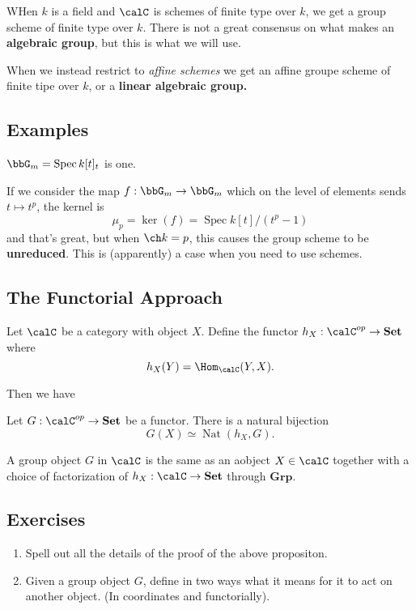 \documentclass[12pt]{article}
\DeclareMathOperator{\1}{\mathbbm{1}}
\begin{document}
WHen $k$ is a field and $\calC$ is schemes of finite type over $k$, we get a group scheme of finite type over $k$. There is not a great consensus on what makes an \textbf{algebraic group}, 
but this is what we will use.

When we instead restrict to \textit{affine schemes} we get an affine groupe scheme of finite tipe over $k$, or a \textbf{linear algebraic group.}

\subsection{Examples}
$\bbG_m=\operatorname{Spec} k[t]_t$ is one. 

If we consider the map $f:\bbG_m\to \bbG_m$ which on the level of elements sends $t\mapsto t^p$, the kernel is 
\[\mu_p=\ker(f)=\operatorname{Spec}k[t]/(t^p-1)\]
and that's great, but when $\ch k=p$, this causes the group scheme to be \textbf{unreduced}. This is (apparently) a case when you need to use schemes.

\subsection{The Functorial Approach}
Let $\calC$ be a category with object $X$. Define the functor $h_X:\calC^{op}\to \mathbf{Set}$ where 
\[h_X(Y)=\Hom_\calC(Y,X).\]

Then we have 
\begin{lem}[Yoneda]
	Let $G:\calC^{op}\to\mathbf{Set}$ be a functor. There is a natural bijection
	\[G(X)\simeq \operatorname{Nat}(h_X,G).\]
\end{lem}
\begin{prop}
	A group object $G$ in $\calC$  is the same as an aobject $X\in\calC$ together with a choice of factorization of 
	$h_X:\calC\to\mathbf{Set}$ through $\mathbf{Grp}$.
\end{prop}

\subsection{Exercises}
\begin{enumerate}
	\item Spell out all the details of the proof of the above propositon.
	\item Given a group object $G$, define in two ways what it means for it to act on another object. (In coordinates and functorially).
\end{enumerate}
\end{document}
